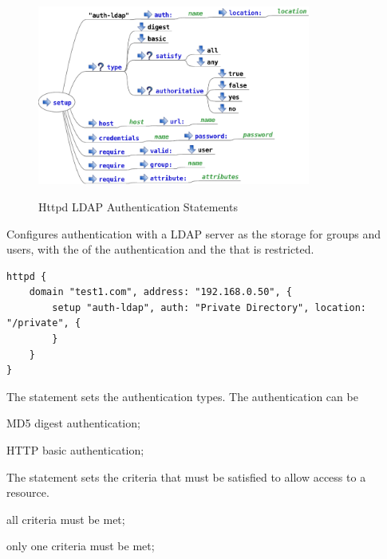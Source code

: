 \begin{figure}[htp]
\centering
\includegraphics[width=0.8\textwidth]{httpd_setup_auth_ldap_script}
\label{fig:httpd_setup_auth_ldap_script}
\caption{Httpd LDAP Authentication Statements}
\end{figure}


Configures authentication with a LDAP server as the storage for groups and users,
with the  of the authentication and the  that is 
restricted.

\begin{lstlisting}[style=Java]
httpd {
    domain "test1.com", address: "192.168.0.50", {
        setup "auth-ldap", auth: "Private Directory", location: "/private", {
        }
    }
}
\end{lstlisting}


The  statement sets the authentication types. The 
authentication can be 
\begin{asparaitem}
\item {} MD5 digest authentication;
\item {} HTTP basic authentication;
\end{asparaitem}

The  statement sets the criteria that must be satisfied to 
allow access to a resource.
\begin{asparaitem}
\item {} all criteria must be met;
\item {} only one criteria must be met;
\end{asparaitem}

